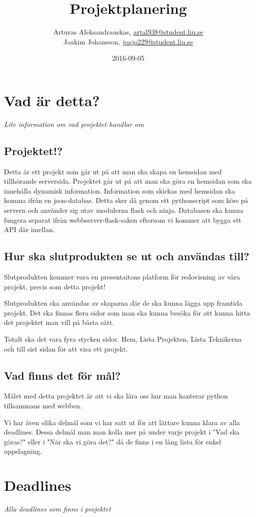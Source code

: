 \documentclass{TDP003mall}
\author{Arturas Aleksandrauskas, \url{artal938@student.liu.se}\\
  Joakim Johansson, \url{joajo229@student.liu.se}}
\title{Projektplanering}
\date{2016-09-05}
\begin{document}
\projectpage


\section{Vad är detta?}
\textit{Lite information om vad projektet handlar om}


\subsection{Projektet!?}
Detta är ett projekt som går ut på att man ska skapa en hemsidan med tillhörande serversida. Projektet går ut på att man ska göra en hemsidan som ska innehålla dynamisk information. Information som skickas med hemsidan ska komma ifrån en json-databas. Detta sker då genom ett pythonscript som körs på servern och använder sig utav modulerna flask och ninja. Databasen ska kunna fungera separat ifrån webbserver-flask-saken eftersom vi kommer att bygga ett API där imellan.

\subsection{Hur ska slutprodukten se ut och användas till?}
Slutprodukten kommer vara en presentaitons platform för redovisning av våra projekt, precis som detta projekt!

Slutprodukten ska användas av skaparna där de ska kunna lägga upp framtida projekt. Det ska finnas flera sidor som man ska kunna besöka för att kunna hitta det projektet man vill på bästa sätt.

Totalt ska det vara fyra stycken sidor. Hem, Lista Projekten, Lista Teknikerna och till sist sidan för att visa ett projekt.

\subsection{Vad finns det för mål?}
Målet med detta projektet är att vi ska lära oss hur man hanterar python tillsammans med webben.

Vi har även olika delmål som vi har satt ut för att lättare kunna klara av alla deadlines. Dessa delmål man man kolla mer på under varje projekt i "Vad ska göras?" eller i "När ska vi göra det?" då de finns i en lång lista för enkel uppslagning.

\newpage





\section{Deadlines}
\textit{Alla deadlines som finns i projektet}
\end{document}
